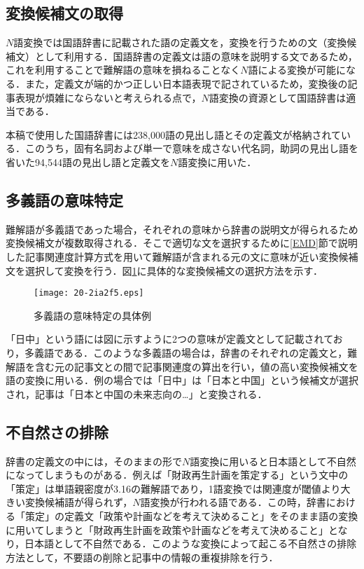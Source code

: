 \documentclass[japanese]{jnlp_1.4}
\begin{document}
\subsection{変換候補文の取得}

$N$語変換では国語辞書\cite{Book_04}に記載された語の定義文を，変換を行うための文（変換候補文）として利用する．国語辞書の定義文は語の意味を説明する文であるため，これを利用することで難解語の意味を損ねることなく$N$語による変換が可能になる．また，定義文が端的かつ正しい日本語表現で記されているため，変換後の記事表現が煩雑にならないと考えられる点で，$N$語変換の資源として国語辞書は適当である．

本稿で使用した国語辞書には238,000語の見出し語とその定義文が格納されている．このうち，固有名詞および単一で意味を成さない代名詞，助詞の見出し語を省いた94,544語の見出し語と定義文を$N$語変換に用いた．


\subsection{多義語の意味特定}

難解語が多義語であった場合，それぞれの意味から辞書の説明文が得られるため変換候補文が複数取得される．そこで適切な文を選択するために\ref{EMD}節で説明した記事関連度計算方式を用いて難解語が含まれる元の文に意味が近い変換候補文を選択して変換を行う．図\ref{fig:tagigo}に具体的な変換候補文の選択方法を示す．

\begin{figure}[b]
 \begin{center}
  \texttt{[image: 20-2ia2f5.eps]}
 \end{center}
 \caption{多義語の意味特定の具体例}
 \label{fig:tagigo}
\end{figure}

「日中」という語には図に示すように2つの意味が定義文として記載されており，多義語である．このような多義語の場合は，辞書のそれぞれの定義文と，難解語を含む元の記事文との間で記事関連度の算出を行い，値の高い変換候補文を語の変換に用いる．例の場合では「日中」は「日本と中国」という候補文が選択され，記事は「日本と中国の未来志向の…」と変換される．


\subsection{不自然さの排除}
\label{NoNeed}

辞書の定義文の中には，そのままの形で$N$語変換に用いると日本語として不自然になってしまうものがある．例えば「財政再生計画を策定する」という文中の「策定」は単語親密度が3.16の難解語であり，1語変換では関連度が閾値より大きい変換候補語が得られず，$N$語変換が行われる語である．この時，辞書における「策定」の定義文「政策や計画などを考えて決めること」をそのまま語の変換に用いてしまうと「財政再生計画を政策や計画などを考えて決めること」となり，日本語として不自然である．このような変換によって起こる不自然さの排除方法として，不要語の削除と記事中の情報の重複排除を行う．
\end{document}
